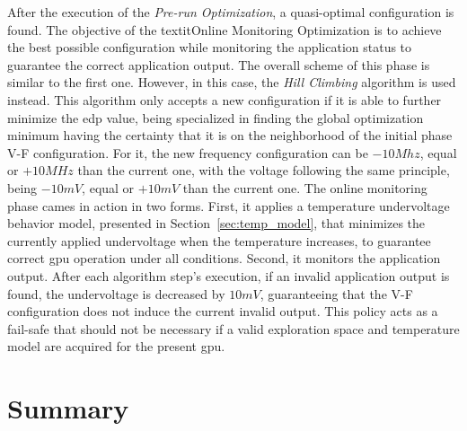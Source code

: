 After the execution of the \textit{Pre-run Optimization}, a quasi-optimal configuration is found. The objective of the textit{Online Monitoring Optimization} is to achieve the best possible configuration while monitoring the application status to guarantee the correct application output. The overall scheme of this phase is similar to the first one. However, in this case, the \textit{Hill Climbing} algorithm is used instead. This algorithm only accepts a new configuration if it is able to further minimize the \acrshort{edp} value, being specialized in finding the global optimization minimum having the certainty that it is on the neighborhood of the initial phase V-F configuration. For it, the new frequency configuration can be $-10Mhz$, equal or $+10MHz$ than the current one, with the voltage following the same principle, being $-10mV$, equal or $+10mV$ than the current one.
The online monitoring phase cames in action in two forms. First, it applies a temperature undervoltage behavior model, presented in Section~\ref{sec:temp_model},  that minimizes the currently applied undervoltage when the temperature increases, to guarantee correct \acrshort{gpu} operation under all conditions. Second, it monitors the application output. After each algorithm step's execution, if an invalid application output is found, the undervoltage is decreased by $10mV$, guaranteeing that the V-F configuration does not induce the current invalid output. This policy acts as a fail-safe that should not be necessary if a valid exploration space and temperature model are acquired for the present \acrshort{gpu}.



\section{Summary}